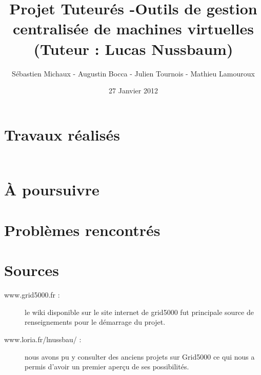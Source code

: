 \documentclass{report}
\begin{document}
\title{Projet Tuteurés -Outils de gestion centralisée de machines virtuelles (Tuteur : Lucas Nussbaum) }
\author{Sébastien Michaux - Augustin Bocca - Julien Tournois - Mathieu Lamouroux}
\date{27 Janvier 2012}
\maketitle
\chapter{Travaux réalisés}
\section{}

\begin{verbatim}

\end{verbatim}

\section{}
\subsection{}

\chapter{À poursuivre}

\chapter{Problèmes rencontrés}

\appendix
\chapter{Sources}
\begin{description}
\item[www.grid5000.fr : ]le wiki disponible sur le site internet de grid5000 fut principale source de renseignements pour le démarrage du projet.
\item[www.loria.fr/lnussbau/ : ]nous avons pu y consulter des anciens projets sur Grid5000 ce qui nous a permis d'avoir un premier aperçu de ses possibilités.
\end{description}
\end{document}
